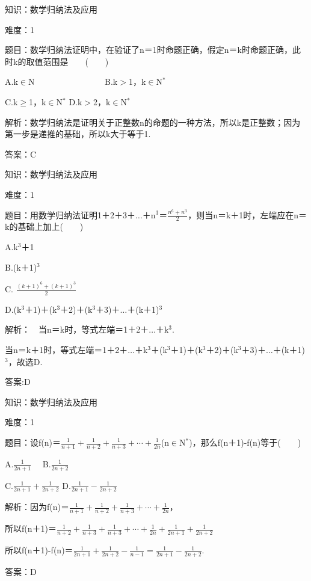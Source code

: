 \documentclass{article} %
\begin{document}
 知识：数学归纳法及应用

 难度：1

 题目：数学归纳法证明中，在验证了n＝1时命题正确，假定n＝k时命题正确，此时k的取值范围是　　(　　)

A.k$\mathrm{\in}$N　　　　　　　　  B.k$\mathrm{>}$1，k$\mathrm{\in}$N${}^{*}$

C.k$\mathrm{\ge}$1，k$\mathrm{\in}$N${}^{*}$  D.k$\mathrm{>}$2，k$\mathrm{\in}$N${}^{*}$

 解析：数学归纳法是证明关于正整数n的命题的一种方法，所以k是正整数；因为第一步是递推的基础，所以k大于等于1.

 答案：C

 

 知识：数学归纳法及应用

 难度：1

 题目：用数学归纳法证明1＋2＋3＋{$\dots$}＋n${}^{3}$＝$\frac{n^6+n^3}{2}$，则当n＝k＋1时，左端应在n＝k的基础上加上(　　)

A.k${}^{3}$＋1  

B.(k＋1)${}^{3}$

C.  $\frac{(k+1)^6+(k+1)^3}{2}$

D.(k${}^{3}$＋1)＋(k${}^{3}$＋2)＋(k${}^{3}$＋3)＋{$\dots$}＋(k＋1)${}^{3}$

 解析：　当n＝k时，等式左端＝1＋2＋{$\dots$}＋k${}^{3}$.

当n＝k＋1时，等式左端＝1＋2＋{$\dots$}＋k${}^{3}$＋(k${}^{3}$＋1)＋(k${}^{3}$＋2)＋(k${}^{3}$＋3)＋{$\dots$}＋(k＋1)${}^{3}$，故选D.

 答案:D

 

 知识：数学归纳法及应用

 难度：1

 题目：设f(n)＝$\frac{1}{n+1}+\frac{1}{n+2}+\frac{1}{n+3}+\cdots+\frac{1}{2n}$(n$\mathrm{\in}$N${}^{*}$)，那么f(n＋1)-f(n)等于(　　)

A.$\frac{1}{2n+1}$　  B.$\frac{1}{2n+2}$

C.$\frac{1}{2n+1}+\frac{1}{2n+2}$  D.$\frac{1}{2n+1}-\frac{1}{2n+2}$

 解析：因为f(n)＝$\frac{1}{n+1}+\frac{1}{n+2}+\frac{1}{n+3}+\cdots+\frac{1}{2n}$，

所以f(n＋1)＝$\frac{1}{n+2}+\frac{1}{n+3}+\frac{1}{n+3}+\cdots+\frac{1}{2n}+\frac{1}{2n+1}+\frac{1}{2n+2}$

所以f(n＋1)-f(n)＝$\frac{1}{2n+1}+\frac{1}{2n+2}-\frac{1}{n-1}=\frac{1}{2n+1}-\frac{1}{2n+2}$.

 答案：D
\end{document}
